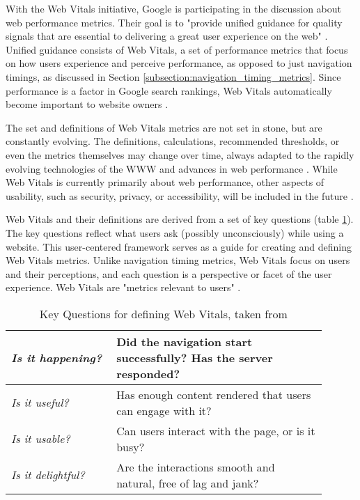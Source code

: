 With the Web Vitals initiative, Google is participating in the discussion about web performance metrics.
Their goal is to "provide unified guidance for quality signals that are essential to delivering a great user experience on the web" \cite{2020WaltonVitals}.
Unified guidance consists of Web Vitals, a set of performance metrics that focus on how users experience and perceive performance, as opposed to just navigation timings, as discussed in Section \ref{subsection:navigation_timing_metrics}.
Since performance is a factor in Google search rankings, Web Vitals automatically become important to website owners \cite{2019OsmaniGrigorik}.


The set and definitions of Web Vitals metrics are not set in stone, but are constantly evolving.
The definitions, calculations, recommended thresholds, or even the metrics themselves may change over time, always adapted to the rapidly evolving technologies of the WWW and advances in web performance \cite{2020WaltonVitals}.
While Web Vitals is currently primarily about web performance, other aspects of usability, such as security, privacy, or accessibility, will be included in the future \cite{2020SullivanMichal}.


Web Vitals and their definitions are derived from a set of key questions (table \ref{table:web_vitals_key_questions}).
The key questions reflect what users ask (possibly unconsciously) while using a website. 
This user-centered framework serves as a guide for creating and defining Web Vitals metrics.
Unlike navigation timing metrics, Web Vitals focus on users and their perceptions, and each question is a perspective or facet of the user experience.
Web Vitals are "metrics relevant to users" \cite{2019WaltonUserCentric}.


\begin{table}[h]
	\small
	\centering
	\begin{tabular}{ | p{0.3\linewidth} | p{0.6\linewidth} | }
	\hline
	\textit{Is it happening?} & Did the navigation start successfully? Has the server responded? \\
	\hline
	\textit{Is it useful?} & Has enough content rendered that users can engage with it? \\
	\hline
	\textit{Is it usable?} & Can users interact with the page, or is it busy? \\
	\hline
	\textit{Is it delightful?} & Are the interactions smooth and natural, free of lag and jank? \\
	\hline
	\end{tabular}
	\medskip
	\caption[Key Questions for defining Web Vitals]{Key Questions for defining Web Vitals, taken from \cite{2019WaltonUserCentric}}
	\label{table:web_vitals_key_questions}
\end{table}


